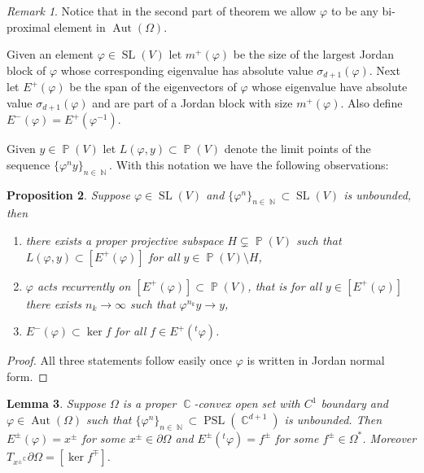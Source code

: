 \documentclass[12pt]{amsart}
\theoremstyle{plain}
\newtheorem{proposition}{Proposition}[section]
\newtheorem{lemma}[proposition]{Lemma}
\theoremstyle{definition}
\theoremstyle{remark}
\newtheorem{remark}[proposition]{Remark}
\begin{document}
\begin{remark} Notice that in the second part of theorem we allow $\varphi$ to be any bi-proximal element in $\operatorname{Aut}(\Omega)$. 
\end{remark}

Given an element $\varphi \in \operatorname{SL}(V)$ let $m^+(\varphi)$ be the size of the largest Jordan block of $\varphi$ whose corresponding eigenvalue has absolute value $\sigma_{d+1}(\varphi)$. Next let $E^+(\varphi)$ be the span of the eigenvectors of $\varphi$ whose eigenvalue have absolute value $\sigma_{d+1}(\varphi)$ and are part of a Jordan block with size $m^+(\varphi)$. Also define $E^-(\varphi) = E^+(\varphi^{-1})$.

Given $y \in \operatorname{\mathbb{P}}(V)$ let $L(\varphi,y) \subset \operatorname{\mathbb{P}}(V)$ denote the limit points of the sequence $\{\varphi^n y\}_{n \in \operatorname{\mathbb{N}}}$. With this notation we have the following observations:

\begin{proposition}
\label{prop:attracting}
Suppose $\varphi \in \operatorname{SL}(V)$ and $\{ \varphi^n\}_{ n \in \operatorname{\mathbb{N}}} \subset \operatorname{SL}(V)$ is unbounded, then
\begin{enumerate}
\item there exists a proper projective subspace $H \subsetneq \operatorname{\mathbb{P}}(V)$ such that $L(\varphi,y) \subset [E^+(\varphi)]$ for all $y \in \operatorname{\mathbb{P}}(V) \setminus H$,
\item $\varphi$ acts recurrently on $[E^+(\varphi)] \subset \operatorname{\mathbb{P}}(V)$, that is for all $y \in [E^+(\varphi)]$ there exists $n_k \rightarrow \infty$ such that $\varphi^{n_k}y \rightarrow y$,
\item $E^-(\varphi) \subset \ker f$ for all $f \in E^+(^t\varphi)$.
\end{enumerate}
\end{proposition}

\begin{proof} All three statements follow easily once $\varphi$ is written in Jordan normal form.
\end{proof}

\begin{lemma}
\label{lem:weak_attract}
Suppose $\Omega$ is a proper $\operatorname{\mathbb{C}}$-convex open set with $C^1$ boundary and $\varphi \in \operatorname{Aut}(\Omega)$ such that $\{\varphi^n \}_{n \in \operatorname{\mathbb{N}}} \subset \operatorname{PSL}(\operatorname{\mathbb{C}}^{d+1})$ is unbounded. Then $E^\pm(\varphi) = x^\pm$ for some $x^\pm \in \partial \Omega$ and $E^\pm(^t\varphi) = f^\pm$ for some $f^\pm\in \Omega^*$. Moreover $T_{x^\pm}^\operatorname{\mathbb{C}} \partial \Omega = [\ker f^\mp]$.
\end{lemma}
\end{document}
